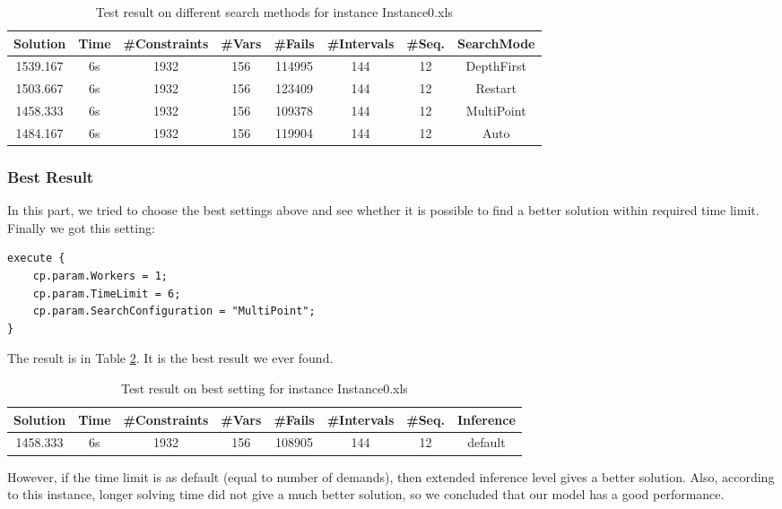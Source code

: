 \documentclass[a4paper, 12pt]{article}
\begin{document}
\begin{table}
    \centering
    \caption{Test result on different search methods for instance Instance0.xls}
    \label{diffSear0}
    \begin{tabular}{|c|c|c|c|c|c|c|c|}
        \hline
        Solution & Time & \#Constraints & \#Vars & \#Fails & \#Intervals & \#Seq. & SearchMode \\
        \hline
        1539.167 & 6s & 1932 & 156 & 114995 & 144 & 12 & DepthFirst \\
        \hline 
        1503.667 & 6s & 1932 & 156 & 123409 & 144 & 12 & Restart \\
        \hline
        1458.333 & 6s & 1932 & 156 & 109378 & 144 & 12 & MultiPoint \\
        \hline
        1484.167 & 6s & 1932 & 156 & 119904 & 144 & 12 & Auto \\
        \hline
    \end{tabular}
\end{table}

\subsubsection{Best Result}

In this part, we tried to choose the best settings above and see whether it is possible to find a better solution within required time limit. Finally we got this setting: 

\begin{lstlisting}
execute {
    cp.param.Workers = 1;
    cp.param.TimeLimit = 6; 
    cp.param.SearchConfiguration = "MultiPoint";
}
\end{lstlisting}

The result is in Table \ref{best0}. It is the best result we ever found.

\begin{table}
    \centering
    \caption{Test result on best setting for instance Instance0.xls}
    \label{best0}
    \begin{tabular}{|c|c|c|c|c|c|c|c|}
        \hline
        Solution & Time & \#Constraints & \#Vars & \#Fails & \#Intervals & \#Seq. & Inference \\
        \hline
        1458.333 & 6s & 1932 & 156 & 108905 & 144 & 12 & default \\
        \hline
    \end{tabular}
\end{table}

However, if the time limit is as default (equal to number of demands), then extended inference level gives a better solution. Also, according to this instance, longer solving time did not give a much better solution, so we concluded that our model has a good performance. 
\end{document}

